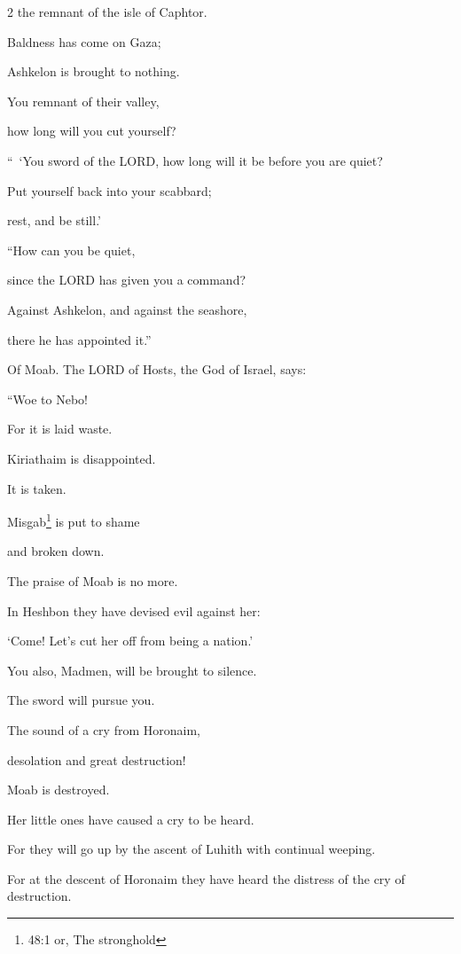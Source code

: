 \begin{multicols}{2}
the remnant of the isle of Caphtor.


\myverse{}Baldness has come on Gaza;

Ashkelon is brought to nothing.

You remnant of their valley,

how long will you cut yourself?

\vspace{\baselineskip}

\myverse{}“ ‘You sword of the LORD, how long will it be before you are quiet?

Put yourself back into your scabbard;

rest, and be still.’

\vspace{\baselineskip}

\myverse{}“How can you be quiet,

since the LORD has given you a command?

Against Ashkelon, and against the seashore,

there he has appointed it.”


\mychapter{} \myverse*{}Of Moab. The LORD of Hosts, the God of Israel, says:

“Woe to Nebo!

For it is laid waste.

Kiriathaim is disappointed.

It is taken.

Misgab\footnote{48:1 or, The stronghold} is put to shame

and broken down.


\myverse{}The praise of Moab is no more.

In Heshbon they have devised evil against her:

‘Come! Let’s cut her off from being a nation.’

You also, Madmen, will be brought to silence.

The sword will pursue you.


\myverse{}The sound of a cry from Horonaim,

desolation and great destruction!


\myverse{}Moab is destroyed.

Her little ones have caused a cry to be heard.


\myverse{}For they will go up by the ascent of Luhith with continual weeping.

For at the descent of Horonaim they have heard the distress of the cry of destruction.



\end{multicols}
